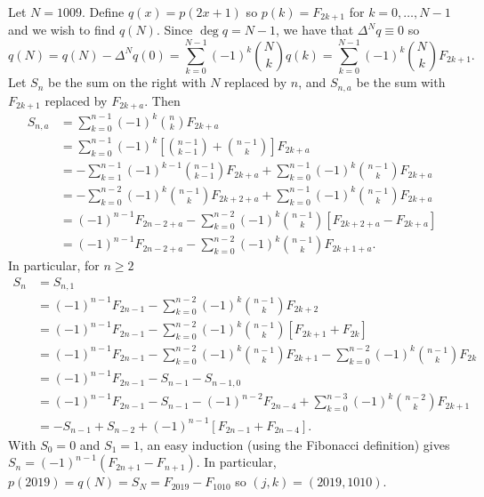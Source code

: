 Let $N=1009$. Define $q(x)=p(2x+1)$ so $p(k)=F_{2k+1}$ for $k=0,\ldots,N-1$ and we wish to find $q(N)$. Since $\deg q=N-1$, we have that $\Delta^Nq\equiv0$ so
\[
	q(N)=q(N)-\Delta^Nq(0)=\sum_{k=0}^{N-1}(-1)^k\binom{N}{k}q(k)=\sum_{k=0}^{N-1}(-1)^k\binom{N}{k}F_{2k+1}.
\]
Let $S_n$ be the sum on the right with $N$ replaced by $n$, and $S_{n,a}$ be the sum with $F_{2k+1}$ replaced by $F_{2k+a}$. Then
\begin{align*}
	S_{n,a} &= \sum_{k=0}^{n-1}(-1)^k\binom{n}{k}F_{2k+a} \\
	&= \sum_{k=0}^{n-1}(-1)^k\left[\binom{n-1}{k-1}+\binom{n-1}{k}\right]F_{2k+a} \\
	&= -\sum_{k=1}^{n-1}(-1)^{k-1}\binom{n-1}{k-1}F_{2k+a}+\sum_{k=0}^{n-1}(-1)^k\binom{n-1}{k}F_{2k+a} \\
	&= -\sum_{k=0}^{n-2}(-1)^k\binom{n-1}{k}F_{2k+2+a}+\sum_{k=0}^{n-1}(-1)^k\binom{n-1}{k}F_{2k+a} \\
	&= (-1)^{n-1}F_{2n-2+a}-\sum_{k=0}^{n-2}(-1)^k\binom{n-1}{k}[F_{2k+2+a}-F_{2k+a}] \\
	&= (-1)^{n-1}F_{2n-2+a}-\sum_{k=0}^{n-2}(-1)^k\binom{n-1}{k}F_{2k+1+a}.
\end{align*}
In particular, for $n\geq2$
\begin{align*}
	S_n &= S_{n,1} \\
	&= (-1)^{n-1}F_{2n-1}-\sum_{k=0}^{n-2}(-1)^k\binom{n-1}{k}F_{2k+2} \\
	&= (-1)^{n-1}F_{2n-1}-\sum_{k=0}^{n-2}(-1)^k\binom{n-1}{k}[F_{2k+1}+F_{2k}] \\
	&= (-1)^{n-1}F_{2n-1}-\sum_{k=0}^{n-2}(-1)^k\binom{n-1}{k}F_{2k+1}-\sum_{k=0}^{n-2}(-1)^k\binom{n-1}{k}F_{2k} \\
	&= (-1)^{n-1}F_{2n-1}-S_{n-1}-S_{n-1,0} \\
	&= (-1)^{n-1}F_{2n-1}-S_{n-1}-(-1)^{n-2}F_{2n-4}+\sum_{k=0}^{n-3}(-1)^k\binom{n-2}{k}F_{2k+1} \\
	&= -S_{n-1}+S_{n-2}+(-1)^{n-1}[F_{2n-1}+F_{2n-4}].
\end{align*}
With $S_0=0$ and $S_1=1$, an easy induction (using the Fibonacci definition) gives $S_n=(-1)^{n-1}(F_{2n+1}-F_{n+1})$. In particular, $p(2019)=q(N)=S_N=F_{2019}-F_{1010}$ so $(j,k)=\boxed{(2019,1010)}$.